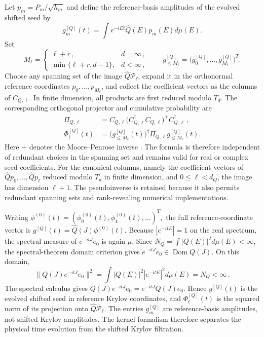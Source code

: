 \documentclass[a4paper,11pt]{article}
\def\dd{d}%
\def\ii{i}%
\def\ee{e}%
\def\Jac{J}%
\theoremstyle{definition}
\theoremstyle{remark}
\newcommand{\dd}{\mathrm d}
\newcommand{\ii}{\mathrm i}
\newcommand{\ee}{\mathrm e}
\newcommand{\cP}{\mathcal P}
\newcommand{\Jac}{\mathsf J}
\newcommand{\Dom}{\operatorname{Dom}}
\newcommand{\Qhat}{\widehat Q}
\begin{document}
Let $p_m=P_m/\sqrt{h_m}$ and define the reference-basis amplitudes of the evolved shifted seed by
\begin{equation}
   g_m^{[Q]}(t)
   =
   \int
   \ee^{-\ii Et}
   \Qhat(E)p_m(E)\dd\mu(E).
   \label{eq:gq-def}
\end{equation}
Set
\begin{equation}
   M_\ell
   =
   \begin{cases}
      \ell+r\,,&d=\infty\,,\\
      \min\{\ell+r,d-1\},&d<\infty\,,
   \end{cases}
   \qquad
   g_{\le M_\ell}^{[Q]}
   =
   \bigl(
      g_0^{[Q]},\ldots,g_{M_\ell}^{[Q]}
   \bigr)^T.
   \label{eq:projection-cutoff-main}
\end{equation}
Choose any spanning set of the image $\Qhat\cP_\ell$, expand it in the orthonormal reference coordinates
$p_0,\ldots,p_{M_\ell}$, and collect the coefficient vectors as the columns of $C_{Q,\ell}$. In finite dimension, all products are first reduced modulo $T_d$. The corresponding orthogonal projector and cumulative probability are
\begin{equation}
\begin{aligned}
   \Pi_{Q,\ell}
   &=
   C_{Q,\ell}
   \bigl(C_{Q,\ell}^\dagger C_{Q,\ell}\bigr)^+
   C_{Q,\ell}^\dagger\,,\\
   \Phi_\ell^{[Q]}(t)
   &=
   \bigl(g_{\le M_\ell}^{[Q]}(t)\bigr)^\dagger
   \Pi_{Q,\ell}
   g_{\le M_\ell}^{[Q]}(t).
\end{aligned}
   \label{eq:projection-coeff-main}
\end{equation}
Here $+$ denotes the Moore--Penrose inverse \cite{BenIsraelGreville2003}. The formula is therefore independent of redundant choices in the spanning set and remains valid for real or complex seed coefficients. For the canonical columns, namely the coefficient vectors of $\Qhat p_0,\ldots,\Qhat p_\ell$ reduced modulo $T_d$ in finite dimension, and $0\le\ell<d_Q$, the image has dimension $\ell+1$. The pseudoinverse is retained because it also permits redundant spanning sets and rank-revealing numerical implementations.

Writing
$
   \phi^{(0)}(t)
   =
   (\phi_0^{(0)}(t),\phi_1^{(0)}(t),\ldots)^T,
$
the full reference-coordinate vector is
$
   g^{[Q]}(t)
   =
   \Qhat(\Jac)\phi^{(0)}(t).
$
Because $|\ee^{-\ii tE}|=1$ on the real spectrum, the spectral measure of $\ee^{-\ii t\Jac}e_0$ is again $\mu$. Since $N_Q=\int |Q(E)|^2\dd\mu(E)<\infty$, the spectral-theorem domain criterion gives $\ee^{-\ii t\Jac}e_0\in\Dom Q(\Jac)$. On this domain,
\begin{equation}
   \bigl\|Q(\Jac)\ee^{-\ii t\Jac}e_0\bigr\|^2
   =\int |Q(E)|^2|\ee^{-\ii tE}|^2\dd\mu(E)
   =N_Q<\infty\,.
   \label{eq:filtered-domain-norm-main}
\end{equation}
The spectral calculus gives
$Q(\Jac)\ee^{-\ii t\Jac}e_0=\ee^{-\ii t\Jac}Q(\Jac)e_0$. Hence
$g^{[Q]}(t)$ is the evolved shifted seed in reference Krylov coordinates, and
$\Phi_\ell^{[Q]}(t)$ is the squared norm of its projection onto
$\Qhat\cP_\ell$. The entries $g_m^{[Q]}$ are reference-basis amplitudes, not shifted Krylov amplitudes. The kernel formalism therefore separates the physical time evolution from the shifted Krylov filtration.
\end{document}
